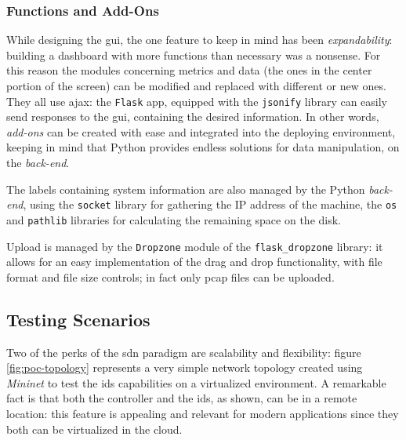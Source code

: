 \subsubsection{Functions and Add-Ons}
\label{subsubsec:functions}

While designing the \gls{gui}, the one feature to keep in mind has been \textit{expandability}: building a dashboard with more functions than necessary was a nonsense. For this reason the modules concerning metrics and data (the ones in the center portion of the screen) can be modified and replaced with different or new ones. They all use \gls{ajax}: the \texttt{Flask} app, equipped with the \texttt{jsonify} library can easily send responses to the \gls{gui}, containing the desired information. In other words, \textit{add-ons} can be created with ease and integrated into the deploying environment, keeping in mind that Python provides endless solutions for data manipulation, on the \textit{back-end}.
\par The labels containing system information are also managed by the Python \textit{back-end}, using the \texttt{socket} library for gathering the IP address of the machine, the \texttt{os} and \texttt{pathlib} libraries for calculating the remaining space on the disk.
\par Upload is managed by the \texttt{Dropzone} module of the \texttt{flask\_dropzone} library: it allows for an easy implementation of the drag and drop functionality, with file format and file size controls; in fact only \gls{pcap} files can be uploaded.


\subsection{Testing Scenarios}
\label{subsec:testing-scenarios}

Two of the perks of the \gls{sdn} paradigm are scalability and flexibility: figure \ref{fig:poc-topology} represents a very simple network topology created using \textit{Mininet} to test the \gls{ids} capabilities on a virtualized environment. A remarkable fact is that both the controller and the \gls{ids}, as shown, can be in a remote location: this feature is appealing and relevant for modern applications since they both can be virtualized in the cloud.

